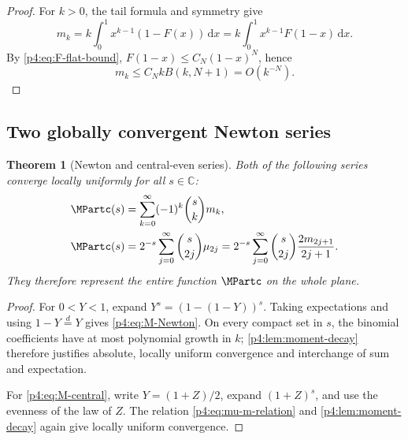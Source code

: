 \documentclass[11pt,oneside]{article}
\newtheorem{theorem}{Theorem}[section]
\theoremstyle{definition}
\theoremstyle{remark}
\newcommand{\F}{F}
\newcommand{\C}{\mathbb C}
\newcommand{\dd}{\,\mathrm d}
\newcommand{\1}{\mathbf 1}
\begin{document}
\begin{proof}
For \(k>0\), the tail formula and symmetry give
\[
 m_k=k\int_0^1x^{k-1}(1-\F(x))\dd x
 =k\int_0^1x^{k-1}\F(1-x)\dd x.
\]
By \cref{p4:eq:F-flat-bound}, \(\F(1-x)\le C_N(1-x)^N\), hence
\[
 m_k\le C_N kB(k,N+1)=O(k^{-N}).
\]
\end{proof}

\subsection{Two globally convergent Newton series}

\begin{theorem}[Newton and central-even series]\label{p4:thm:newton}
Both of the following series converge locally uniformly for all \(s\in\C\):
\begin{align}
 \MPartc(s)&=\sum_{k=0}^{\infty}(-1)^k\binom{s}{k}m_k,
 \label{p4:eq:M-Newton}\\
 \MPartc(s)&=2^{-s}\sum_{j=0}^{\infty}\binom{s}{2j}\mu_{2j}
 =2^{-s}\sum_{j=0}^{\infty}\binom{s}{2j}\frac{2m_{2j+1}}{2j+1}.
 \label{p4:eq:M-central}
\end{align}
They therefore represent the entire function \(\MPartc\) on the whole plane.
\end{theorem}

\begin{proof}
For \(0<Y<1\), expand
\(Y^s=(1-(1-Y))^s\).  Taking expectations and using
\(1-Y\overset d=Y\) gives \cref{p4:eq:M-Newton}.  On every compact set in \(s\), the
binomial coefficients have at most polynomial growth in \(k\); \cref{p4:lem:moment-decay}
therefore justifies absolute, locally uniform convergence and interchange of sum and
expectation.

For \cref{p4:eq:M-central}, write \(Y=(1+Z)/2\), expand \((1+Z)^s\), and use the
evenness of the law of \(Z\).  The relation \cref{p4:eq:mu-m-relation} and
\cref{p4:lem:moment-decay} again give locally uniform convergence.
\end{proof}
\end{document}
